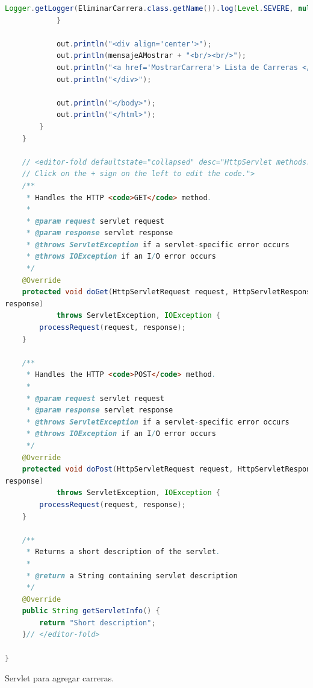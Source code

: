 \documentclass[a4paper,12pt]{article}
\begin{document}
\begin{lstlisting}[language=Java, style=customJava, 
caption={EliminarCarrera.java}, captionpos=b, 
basicstyle=\fontfamily{cmss}\small]
Logger.getLogger(EliminarCarrera.class.getName()).log(Level.SEVERE, null, ex);
            }

            out.println("<div align='center'>");
            out.println(mensajeAMostrar + "<br/><br/>");
            out.println("<a href='MostrarCarrera'> Lista de Carreras </a>");
            out.println("</div>");

            out.println("</body>");
            out.println("</html>");
        }
    }

    // <editor-fold defaultstate="collapsed" desc="HttpServlet methods. 
    // Click on the + sign on the left to edit the code.">
    /**
     * Handles the HTTP <code>GET</code> method.
     *
     * @param request servlet request
     * @param response servlet response
     * @throws ServletException if a servlet-specific error occurs
     * @throws IOException if an I/O error occurs
     */
    @Override
    protected void doGet(HttpServletRequest request, HttpServletResponse 
response)
            throws ServletException, IOException {
        processRequest(request, response);
    }

    /**
     * Handles the HTTP <code>POST</code> method.
     *
     * @param request servlet request
     * @param response servlet response
     * @throws ServletException if a servlet-specific error occurs
     * @throws IOException if an I/O error occurs
     */
    @Override
    protected void doPost(HttpServletRequest request, HttpServletResponse 
response)
            throws ServletException, IOException {
        processRequest(request, response);
    }

    /**
     * Returns a short description of the servlet.
     *
     * @return a String containing servlet description
     */
    @Override
    public String getServletInfo() {
        return "Short description";
    }// </editor-fold>

}
\end{lstlisting}

Servlet para agregar carreras.
\end{document}

